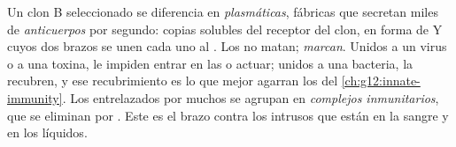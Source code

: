 \begin{proposition}\label{prop:g12:adaptive-immunity:antibodies}
Un clon B seleccionado se diferencia en \emph{ plasmáticas},
fábricas que secretan miles de \emph{anticuerpos} por
segundo: copias solubles del receptor del clon,  en forma de Y
cuyos dos brazos se unen cada uno al . Los  no
matan; \emph{marcan}. Unidos a un virus o a una toxina, le impiden
entrar en las  o actuar; unidos a una bacteria, la recubren, y
ese recubrimiento es lo que mejor agarran los  del
\cref{ch:g12:innate-immunity}. Los  entrelazados por muchos
 se agrupan en \emph{complejos inmunitarios}, que se
eliminan por . Este es el brazo contra los intrusos que están
en la sangre y en los líquidos.
\end{proposition}
\admitted

